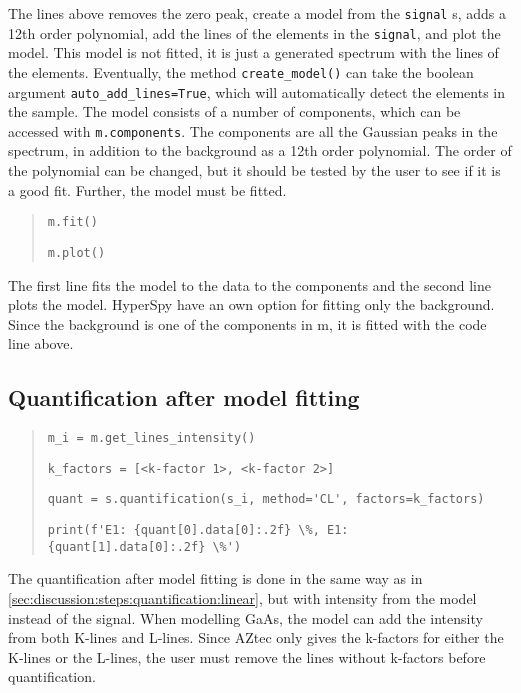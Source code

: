 The lines above removes the zero peak, create a model from the \verb|signal| s, adds a 12th order polynomial, add the lines of the elements in the \verb|signal|, and plot the model.
This model is not fitted, it is just a generated spectrum with the lines of the elements.
Eventually, the method \verb|create_model()| can take the boolean argument \verb|auto_add_lines=True|, which will automatically detect the elements in the sample.
The model consists of a number of components, which can be accessed with \verb|m.components|.
The components are all the Gaussian peaks in the spectrum, in addition to the background as a 12th order polynomial.
The order of the polynomial can be changed, but it should be tested by the user to see if it is a good fit.
Further, the model must be fitted.

\begin{quote}
    \verb|m.fit()|


    \verb|m.plot()|
\end{quote}

The first line fits the model to the data to the components and the second line plots the model.
HyperSpy have an own option for fitting only the background.
Since the background is one of the components in m, it is fitted with the code line above.


\subsection{Quantification after model fitting}
\label{sec:discussion:steps:quantification:model}

\begin{quote}
    \verb|m_i = m.get_lines_intensity()|

    \verb|k_factors = [<k-factor 1>, <k-factor 2>] |

    \verb|quant = s.quantification(s_i, method='CL', factors=k_factors)|

    \verb|print(f'E1: {quant[0].data[0]:.2f} \%, E1: {quant[1].data[0]:.2f} \%')|

\end{quote}

The quantification after model fitting is done in the same way as in \cref{sec:discussion:steps:quantification:linear}, but with intensity from the model instead of the signal.
When modelling GaAs, the model can add the intensity from both K-lines and L-lines.
Since AZtec only gives the k-factors for either the K-lines or the L-lines, the user must remove the lines without k-factors before quantification.


